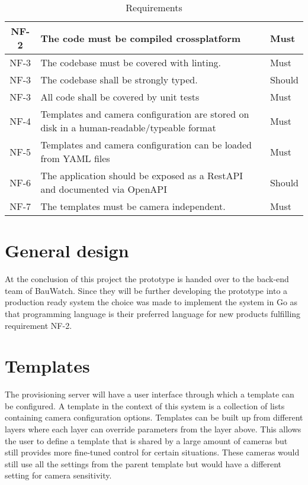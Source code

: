 \begin{table*}[h]
\begin{tabulary}{\linewidth}{CLL}
        \\ \hline
        NF-2 & The code must be compiled crossplatform & Must
        \\ \hline
        NF-3 & The codebase must be covered with linting. & Must
        \\ \hline
        NF-3 & The codebase shall be strongly typed. & Should
        \\ \hline
        NF-3 & All code shall be covered by unit tests & Must
        \\ \hline
        NF-4 & Templates and camera configuration are stored on disk in a human-readable/typeable format & Must
        \\ \hline
        NF-5 & Templates and camera configuration can be loaded from YAML files & Must
        \\ \hline %
        NF-6 & The application should be exposed as a RestAPI and documented via OpenAPI & Should
        \\ \hline
        NF-7 & The templates must be camera independent. & Must
    \end{tabulary}
    \caption{Requirements}
    \label{tab:requirements}
\end{table*}

\section{General design}
At the conclusion of this project the prototype is handed over to the back-end team of BauWatch.
Since they will be further developing the prototype into a production ready system the choice was made to implement the system in Go as that programming language is their preferred language for new products fulfilling requirement NF-2.

\section{Templates}
The provisioning server will have a user interface through which a template can be configured.
A template in the context of this system is a collection of lists containing camera configuration options.
Templates can be built up from different layers where each layer can override parameters from the layer above.
This allows the user to define a template that is shared by a large amount of cameras but still provides more fine-tuned control for certain situations.
These cameras would still use all the settings from the parent template but would have a different setting for camera sensitivity.

